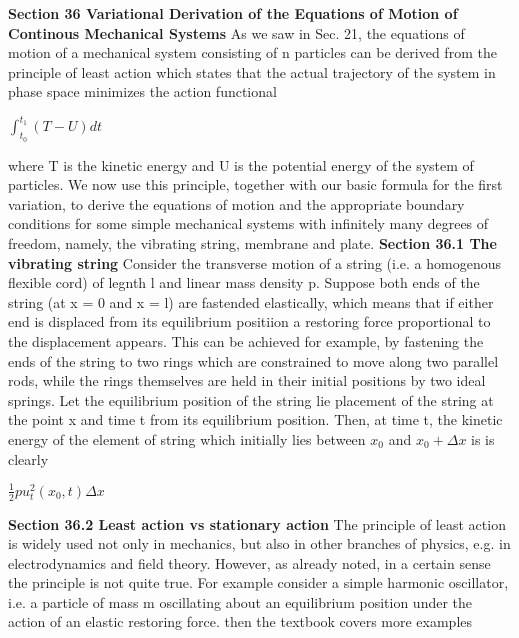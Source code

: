 \documentclass{article}
\begin{document}
\textbf {Section 36 Variational Derivation of the Equations of Motion of Continous Mechanical Systems} As we saw in Sec. 21, the equations of motion of a mechanical system consisting of n particles can be derived from the principle of least action which states that the actual trajectory of the system in phase space minimizes the action functional
\begin{center}
$\int_{t_0}^{t_1} (T- U) dt$
\end{center}
where T is the kinetic energy and U is the potential energy of the system of particles. We now use this principle, together with our basic formula for the first variation, to derive the equations of motion and the appropriate boundary conditions for some simple mechanical systems with infinitely many degrees of freedom, namely, the vibrating string, membrane and plate.
\textbf {Section 36.1 The vibrating string} Consider the transverse motion of a string (i.e. a homogenous flexible cord) of legnth l and linear mass density p. Suppose both ends of the string (at x = 0 and x = l) are fastended elastically, which means that if either end is displaced from its equilibrium positiion a restoring force proportional to the displacement appears. This can be achieved for example, by fastening the ends of the string to two rings which are constrained to move along two parallel rods, while the rings themselves are held in their initial positions by two ideal springs. Let the equilibrium position of the string lie placement of the string at the point x and time t from its equilibrium position. Then, at time t, the kinetic energy of the element of string which initially lies between $x_0$ and $x_0 + \Delta x$ is is clearly 
\begin{center}
$\frac{1}{2} pu_t^2(x_0, t) \Delta x$
\end{center}

\textbf {Section 36.2 Least action vs stationary action} The principle of least action is widely used not only in mechanics, but also in other branches of physics, e.g. in electrodynamics and field theory. However, as already noted, in a certain sense the principle is not quite true. For example consider a simple harmonic oscillator, i.e. a particle of mass m oscillating about an equilibrium position under the action of an elastic restoring force. then the textbook covers more examples
\end{document}
